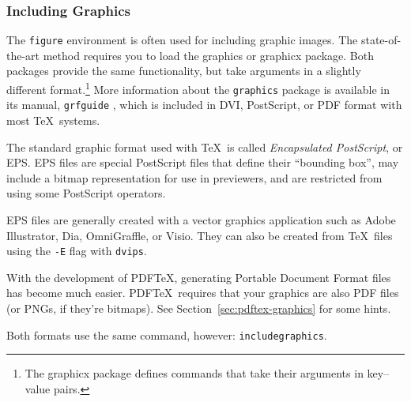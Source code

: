 \documentclass{icmmcm}
\newcommand{\bslash}{\symbol{'134}}%
\newcommand{\bsl}{{\texttt{\bslash}}}
\newcommand{\com}[1]{\bsl\texttt{#1}\xspace}
\newcommand{\package}[1]{\textsf{#1}\xspace}
\newcommand{\env}[1]{\texttt{#1}\xspace}
\newcommand{\prog}[1]{\texttt{#1}\xspace}
\begin{document}
{\subsubsection{Including Graphics}%
\label{sec:including-graphics}

The \env{figure} environment is often used for including graphic
images.  The state-of-the-art method requires you to load the
\package{graphics} or \package{graphicx} package.  Both packages
provide the same functionality, but take arguments in a slightly
different format.\footnote{The \package{graphicx} package defines
  commands that take their arguments in key--value pairs.}  More
information about the \texttt{graphics} package is available in its
manual, \texttt{grfguide} \cite{carlisle-grfguide}, which is included
in DVI, PostScript, or PDF format with most \TeX\ systems.

The standard graphic format used with \TeX\ is called
\emph{Encapsulated PostScript}, or EPS.  EPS files are special
PostScript files that define their ``bounding box'', may include a
bitmap representation for use in previewers, and are restricted from
using some PostScript operators.

EPS files are generally created with a vector graphics application
such as Adobe Illustrator, Dia, OmniGraffle, or Visio.  They can also
be created from \TeX\ files using the \texttt{-E} flag with
\prog{dvips}.

With the development of PDF\TeX, generating Portable Document Format
files has become much easier.  PDF\TeX\ requires that your graphics
are also PDF files (or PNGs, if they're bitmaps).  See
Section~\ref{sec:pdftex-graphics} for some hints.

Both formats use the same command, however: \com{includegraphics}.

}
\end{document}

